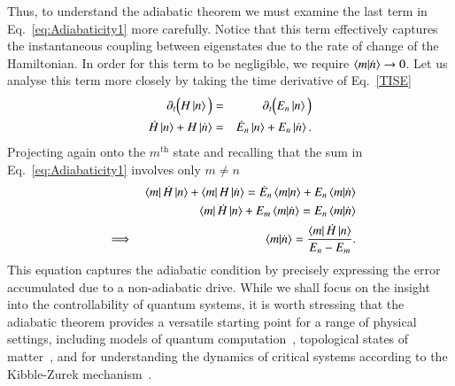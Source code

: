 Thus, to understand the adiabatic theorem we must examine the last term in Eq.~\eqref{eq:Adiabaticity1} more carefully. Notice that this term effectively captures the instantaneous coupling between eigenstates due to the rate of change of the Hamiltonian. In order for this term to be negligible, we require $\braket{m}{\dot{n}}\to0$. Let us analyse this term more closely by taking the time derivative of Eq.~\eqref{TISE}
\begin{eqnarray}
\partial_t \Big( H \ket{n} \Big) & = & \partial_t \Big( E_n \ket{n} \Big) \nonumber \\
\dot{H} \ket{n} + H \ket{\dot{n}} &=& \dot{E}_n \ket{n} + E_n \ket{\dot{n}}.
\end{eqnarray}
Projecting again onto the $m^\text{th}$ state and recalling that the sum in Eq.~\eqref{eq:Adiabaticity1} involves only $m\neq n$
\begin{eqnarray}
&&\bra{m} \dot{H} \ket{n} + \bra{m} H \ket{\dot{n}} =  \dot{E}_n \braket{m}{n} + E_n \braket{m}{\dot{n}} \nonumber \\
&&\bra{m} \dot{H} \ket{n} + E_m \braket{m}{\dot{n}}   = E_n \braket{m}{\dot{n}} \nonumber \\
&\implies& \braket{m}{\dot{n}} = \frac{\bra{m} \dot{H} \ket{n}}{E_n - E_m}. \label{eq:AdiabaticCond}
\end{eqnarray}
This equation captures the adiabatic condition by precisely expressing the error accumulated due to a non-adiabatic drive. While we shall focus on the insight into the controllability of quantum systems, it is worth stressing that the adiabatic theorem provides a versatile starting point for a range of physical settings, including models of quantum computation~\cite{AdiabaticComp}, topological states of matter~\cite{BudichReview}, and for understanding the dynamics of critical systems according to the Kibble-Zurek mechanism~\cite{polkovnikov2005universal, Uwe1, Uwe2, DziarmagaPRL, Damski2005, DelCampo2014, Puebla2020}. 


